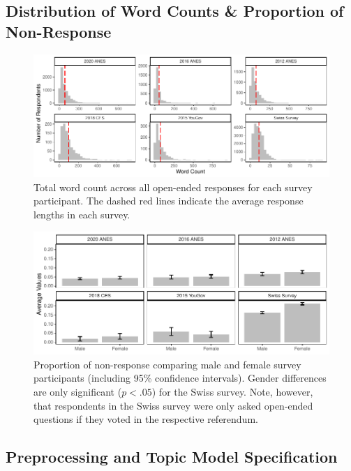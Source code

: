 \documentclass[12pt]{article}
\begin{document}
\subsection{Distribution of Word Counts \& Proportion of Non-Response}
\begin{figure}[ht]\centering
	\includegraphics{../out/appB1-wc.pdf}
	\caption[Total word count across all open-ended responses]{Total word count across all open-ended responses for each survey participant. The dashed red lines indicate the average response lengths in each survey.}\label{fig:wc}
\end{figure}

\begin{figure}[ht]\centering
	\includegraphics{../out/appB2-noresponse.pdf}
	\caption{Proportion of non-response comparing male and female survey participants (including 95\% confidence intervals). Gender differences are only significant ($p<.05$) for the Swiss survey. Note, however, that respondents in the Swiss survey were only asked open-ended questions if they voted in the respective referendum.}
\end{figure}


\clearpage
\subsection{Preprocessing and Topic Model Specification}
\end{document}
